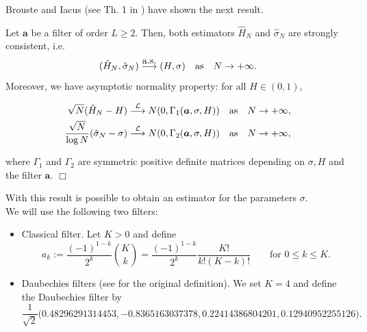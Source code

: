 \documentclass[smallextended]{svjour3}
\begin{document}
Brouste and Iacus (see Th. 1 in \cite{br-ia}) have shown the next result.
\begin{theorem}
    Let  $\bm{a}$ be a filter of order $L \ge 2$. Then, both estimators
    $\hat{H}_N$ and $\hat{\sigma}_N$  are
    strongly consistent, i.e.
    \[
    ( \hat{H}_N,\hat{\sigma}_N) \stackrel{\hbox{\rm a.s.}}{\longrightarrow}
    (H,\sigma) \quad \hbox{\rm as}\quad N \rightarrow+\infty.
    \]
    Moreover, we have asymptotic normality property:  for all $H \in (0, 1)$,

    \begin{align*}
    \sqrt{N} (\hat{H}_N  - H ) &\stackrel{\mathcal{L}}{\longrightarrow} N (0,
    \Gamma_1 ( \bm{a},\sigma,H)) \quad  \hbox{\rm as} \quad N
    \rightarrow +\infty,\\
    \frac{\sqrt{N}}{\log N} ( \hat{\sigma}_N  - \sigma )
    &\stackrel{\mathcal{L}}{\longrightarrow} N (0, \Gamma_2 (\bm{a},\sigma,H))
    \quad
    \hbox{\rm as} \quad N \rightarrow +\infty,
    \end{align*}

    where $\Gamma_1$ and $\Gamma_2$ are symmetric positive definite matrices
    depending on $\sigma, H$ and the filter $\bm{a}$.
    \hfill$\Box$
\end{theorem}

With this result is possible to obtain an estimator for the parameters
$\sigma$.\\



We will use the following two filters:
\begin{itemize}
    \item Classical filter. Let $K>0$ and define
    \begin{equation*}
    a_k:= \frac{(-1)^{1-k}}{2^k} {K\choose k} =\frac{(-1)^{1-k}}{2^k}
    \frac{K!}{k!(K-k)!}\qquad \mbox{for }  0\le k\le K.
    \end{equation*}


    \item Daubechies filters (see \cite{de} for the original definition). We
    set $K=4$ and define the Daubechies filter by
    \begin{equation*}
    \frac{1}{\sqrt{2}} \big(0.48296291314453, -0.8365163037378,
    0.22414386804201, 0.12940952255126\big).
    \end{equation*}

\end{itemize}
\end{document}
